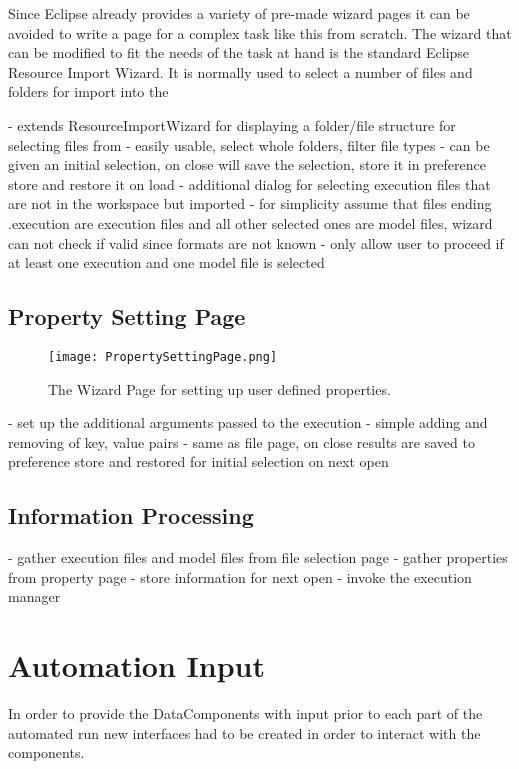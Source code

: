 Since Eclipse already provides a variety of pre-made wizard pages it can be avoided to write a page for a
complex task like this from scratch. The wizard that can be modified to fit the needs of the task at hand
is the standard Eclipse Resource Import Wizard. It is normally used to select a number of files and folders
for import into the 

- extends ResourceImportWizard for displaying a folder/file structure for selecting files from
- easily usable, select whole folders, filter file types
- can be given an initial selection, on close will save the selection, store it in preference store
and restore it on load
- additional dialog for selecting execution files that are not in the workspace but imported
- for simplicity assume that files ending .execution are execution files and all other selected
ones are model files, wizard can not check if valid since formats are not known
- only allow user to proceed if at least one execution and one model file is selected
\subsection{Property Setting Page}

\begin{figure}[Property Setting Page]
  \centering
  \texttt{[image: PropertySettingPage.png]}
  \caption[The Wizard Page for setting up user defined properties.]%
  {The Wizard Page for setting up user defined properties.\protect}
  \label{fig:PropertySettingPage}
\end{figure}
- set up the additional arguments passed to the execution
- simple adding and removing of key, value pairs
- same as file page, on close results are saved to preference store and restored for initial
selection on next open
\subsection{Information Processing}
- gather execution files and model files from file selection page
- gather properties from property page
- store information for next open
- invoke the execution manager


\section{Automation Input}
\label{section:AutoInput}
In order to provide the DataComponents with input prior to each part of the automated run new interfaces
had to be created in order to interact with the components.


